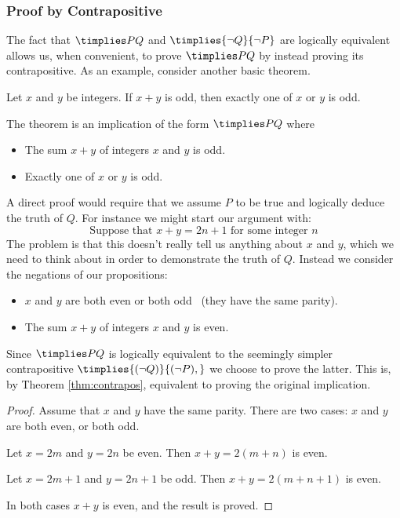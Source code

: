\subsubsection*{Proof by Contrapositive}

The fact that $\timplies PQ$ and $\timplies{\neg Q}{\neg P}$ are logically equivalent allows us, when convenient, to prove $\timplies PQ$ by instead proving its contrapositive. As an example, consider another basic theorem.

\begin{thm}
Let $x$ and $y$ be integers. If $x+y$ is odd, then exactly one of $x$ or $y$ is odd.
\end{thm}

\noindent The theorem is an implication of the form $\timplies PQ$ where
\begin{itemize}\setlength{\itemsep}{0pt}
  \item[] The sum $x+y$ of integers $x$ and $y$ is odd.
  \item[] Exactly one of $x$ or $y$ is odd.
\end{itemize}

\noindent A direct proof would require that we assume $P$ to be true and logically deduce the truth of $Q$. For instance we might start our argument with:
\[\text{Suppose that $x+y=2n+1$ for some integer $n$}\]
The problem is that this doesn't really tell us anything about $x$ and $y$, which we need to think about in order to demonstrate the truth of $Q$. Instead we consider the negations of our propositions:
\begin{itemize}\setlength{\itemsep}{0pt}
  \item[]\quad $x$ and $y$ are both even or both odd \ (they have the same parity).
  \item[]\quad The sum $x+y$ of integers $x$ and $y$ is even.
\end{itemize}
Since $\timplies PQ$ is logically equivalent to the seemingly simpler contrapositive $\timplies{(\neg Q)}{(\neg P),}$ we choose to prove the latter. This is, by Theorem \ref{thm:contrapos}, equivalent to proving the original implication.

\begin{proof}
Assume that $x$ and $y$ have the same parity. There are two cases: $x$ and $y$ are both even, or both odd.
\begin{description}\setlength{\itemsep}{0pt}
  \item[Case 1:] Let $x=2m$ and $y=2n$ be even. Then $x+y=2(m+n)$ is even.
  \item[Case 2:] Let $x=2m+1$ and $y=2n+1$ be odd. Then $x+y=2(m+n+1)$ is even.
\end{description}
In both cases $x+y$ is even, and the result is proved.
\end{proof}

